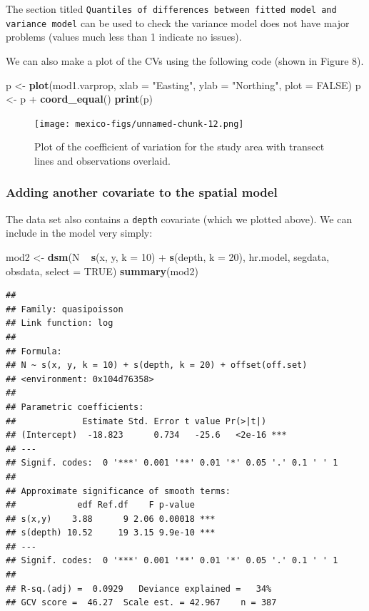 \documentclass[]{article}
\newenvironment{Shaded}{}{}
\newcommand{\KeywordTok}[1]{\textcolor[rgb]{0.00,0.44,0.13}{\textbf{{#1}}}}
\newcommand{\DataTypeTok}[1]{\textcolor[rgb]{0.56,0.13,0.00}{{#1}}}
\newcommand{\DecValTok}[1]{\textcolor[rgb]{0.25,0.63,0.44}{{#1}}}
\newcommand{\StringTok}[1]{\textcolor[rgb]{0.25,0.44,0.63}{{#1}}}
\newcommand{\OtherTok}[1]{\textcolor[rgb]{0.00,0.44,0.13}{{#1}}}
\newcommand{\NormalTok}[1]{{#1}}
\begin{document}
The section titled
\texttt{Quantiles of differences between fitted model and variance model}
can be used to check the variance model does not have major problems
(values much less than 1 indicate no issues).

We can also make a plot of the CVs using the following code (shown in
Figure 8).

\begin{Shaded}
\begin{Highlighting}[]
\NormalTok{p <-}\StringTok{ }\KeywordTok{plot}\NormalTok{(mod1.varprop, }\DataTypeTok{xlab =} \StringTok{"Easting"}\NormalTok{, }\DataTypeTok{ylab =} \StringTok{"Northing"}\NormalTok{, }\DataTypeTok{plot =} \OtherTok{FALSE}\NormalTok{)}
\NormalTok{p <-}\StringTok{ }\NormalTok{p +}\StringTok{ }\KeywordTok{coord_equal}\NormalTok{()}
\KeywordTok{print}\NormalTok{(p)}
\end{Highlighting}
\end{Shaded}

\begin{figure}[htbp]
\centering
\texttt{[image: mexico-figs/unnamed-chunk-12.png]}
\caption{Plot of the coefficient of variation for the study area with
transect lines and observations overlaid.}
\end{figure}

\subsubsection{Adding another covariate to the spatial
model}\label{adding-another-covariate-to-the-spatial-model}

The data set also contains a \texttt{depth} covariate (which we plotted
above). We can include in the model very simply:

\begin{Shaded}
\begin{Highlighting}[]
\NormalTok{mod2 <-}\StringTok{ }\KeywordTok{dsm}\NormalTok{(N ~}\StringTok{ }\KeywordTok{s}\NormalTok{(x, y, }\DataTypeTok{k =} \DecValTok{10}\NormalTok{) +}\StringTok{ }\KeywordTok{s}\NormalTok{(depth, }\DataTypeTok{k =} \DecValTok{20}\NormalTok{), hr.model, segdata, obsdata, }
    \DataTypeTok{select =} \OtherTok{TRUE}\NormalTok{)}
\KeywordTok{summary}\NormalTok{(mod2)}
\end{Highlighting}
\end{Shaded}

\begin{verbatim}
## 
## Family: quasipoisson 
## Link function: log 
## 
## Formula:
## N ~ s(x, y, k = 10) + s(depth, k = 20) + offset(off.set)
## <environment: 0x104d76358>
## 
## Parametric coefficients:
##             Estimate Std. Error t value Pr(>|t|)    
## (Intercept)  -18.823      0.734   -25.6   <2e-16 ***
## ---
## Signif. codes:  0 '***' 0.001 '**' 0.01 '*' 0.05 '.' 0.1 ' ' 1
## 
## Approximate significance of smooth terms:
##            edf Ref.df    F p-value    
## s(x,y)    3.88      9 2.06 0.00018 ***
## s(depth) 10.52     19 3.15 9.9e-10 ***
## ---
## Signif. codes:  0 '***' 0.001 '**' 0.01 '*' 0.05 '.' 0.1 ' ' 1
## 
## R-sq.(adj) =  0.0929   Deviance explained =   34%
## GCV score =  46.27  Scale est. = 42.967    n = 387
\end{verbatim}
\end{document}
